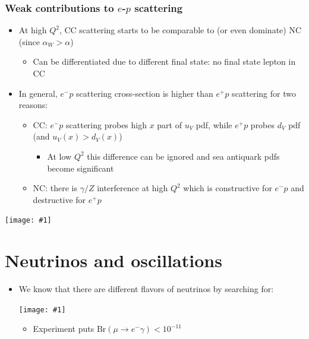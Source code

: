 \documentclass[11pt]{article}
\newcommand{\el}{\ensuremath{e^{-}}\xspace}
\newcommand{\pos}{\ensuremath{e^{+}}\xspace}
\newcommand{\embedimgw}[2]{\begin{center}\texttt{[image: \#1]}\end{center}}
\begin{document}
\subsubsection{Weak contributions to $e$-$p$ scattering}
\begin{itemize}
  \item At high $Q^2$, CC scattering starts to be comparable to (or even dominate) NC (since $\alpha_W > \alpha$)
  \begin{itemize}
    \item Can be differentiated due to different final state: no final state lepton in CC
  \end{itemize}
  \item In general, $\el p$ scattering cross-section is higher than $\pos p$ scattering for two reasons:
  \begin{itemize}
    \item CC: $\el p$ scattering probes high $x$ part of $u_V$ pdf, while $\pos p$ probes $d_V$ pdf (and $u_V(x) > d_V(x)$)
    \begin{itemize}
      \item At low $Q^2$ this difference can be ignored and sea antiquark pdfs become significant
    \end{itemize}
    \item NC: there is $\gamma/Z$ interference at high $Q^2$ which is constructive for $\el p$ and destructive for $\pos p$
  \end{itemize}
\end{itemize}
\embedimgw{figs/weakdis.png}{.4}

\section{Neutrinos and oscillations}
\begin{itemize}
  \item We know that there are different flavors of neutrinos by searching for:
  \embedimgw{figs/mu2e.png}{.3}
  \begin{itemize}
    \item Experiment puts $\text{Br}(\mu\rightarrow\el\gamma)<10^{-11}$
  \end{itemize}
\end{itemize}
\end{document}
